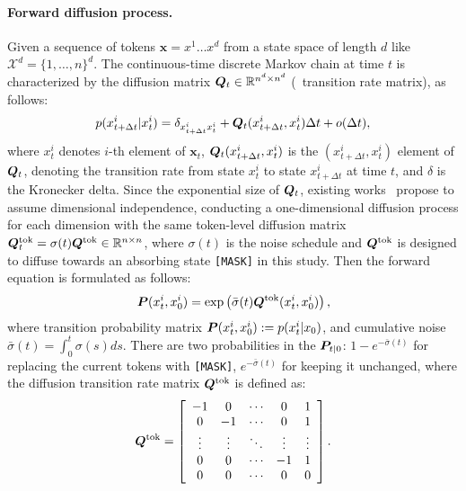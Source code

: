 \paragraph{Forward diffusion process.~~\xspace}
Given a sequence of tokens $\bm{x} = x^1 \ldots x^d$ from a state space of length $d$ like $\mathcal{X}^d = \{1, \ldots, n\}^d$. The continuous-time discrete Markov chain at time $t$ is characterized by the diffusion matrix ${\bm{Q}}_t\in \mathbb{R}^{n^d\times n^d}$ (\ie~transition rate matrix), as follows:
\begin{equation}
\label{eq:ap_delta_transition}
    p({x}_{t+ \Delta t}^i|x_t^i) =  \delta_{{x}^i_{t+ \Delta t}x^i_t} + {\bm{Q}}_t({x}^i_{t+ \Delta t},x^i_t)\Delta t + o(\Delta t),
\end{equation}
where $x^i_t$ denotes $i$-th element of $\bm{x}_t$, ${\bm{Q}}_t({x}^i_{t+ \Delta t},x^i_t)$ is the $({x}^i_{t+ \Delta t},x^i_t)$ element of ${\bm{Q}}_t$, denoting the transition rate from state $x^i_t$ to state ${x}^i_{t+ \Delta t}$ at time $t$, and $\delta$ is the Kronecker delta. Since the exponential size of ${\bm{Q}}_t$, existing works~\cite{SEDD:conf/icml/LouME24,RADD:journals/corr/abs-2406-03736} propose to assume dimensional independence, conducting a one-dimensional diffusion process for each dimension with the same token-level diffusion matrix ${\bm{Q}}_t^\text{tok}=\sigma(t){\bm{Q}}^\text{tok}\in \mathbb{R}^{n\times n}$, where $\sigma(t)$ is the noise schedule and ${\bm{Q}}^\text{tok}$ is designed to diffuse towards an absorbing state \texttt{[MASK]} in this study. Then the forward equation is formulated as follows: 
\begin{equation}
\label{eq:ap_forward_diffusion}
    {\bm{P}}({x}^i_t,x^i_0) = \exp\left(\bar{\sigma}(t) {\bm{Q}}^\text{tok}({x}^i_t,x^i_0) \right), 
\end{equation}
where transition probability matrix ${\bm{P}}({x}^i_t,x^i_0) := p({x}^i_t|x_0)$, and cumulative noise $\bar{\sigma}(t) = \int_0^t \sigma(s)ds$. There are two probabilities in the ${\bm{P}}_{t|0}$: \( 1 - e^{-\bar{\sigma}(t)} \) for replacing the current tokens with \texttt{[MASK]}, \( e^{-\bar{\sigma}(t)} \) for keeping it unchanged, where the diffusion transition rate matrix ${\bm{Q}}^\text{tok}$ is defined as:
\begin{align}
    {\bm{Q}}^\text{tok}=\left[\begin{array}{ccccc}
    \footnotesize
            -1     & 0      & \cdots & 0      & 1      \\
            0      & -1     & \cdots & 0      & 1      \\
            \vdots & \vdots & \ddots & \vdots & \vdots \\
            0      & 0      & \cdots & -1     & 1      \\
            0      & 0      & \cdots & 0      & 0
    \end{array}\right]. 
    \label{eq:ap_absorb_q}
\end{align}

